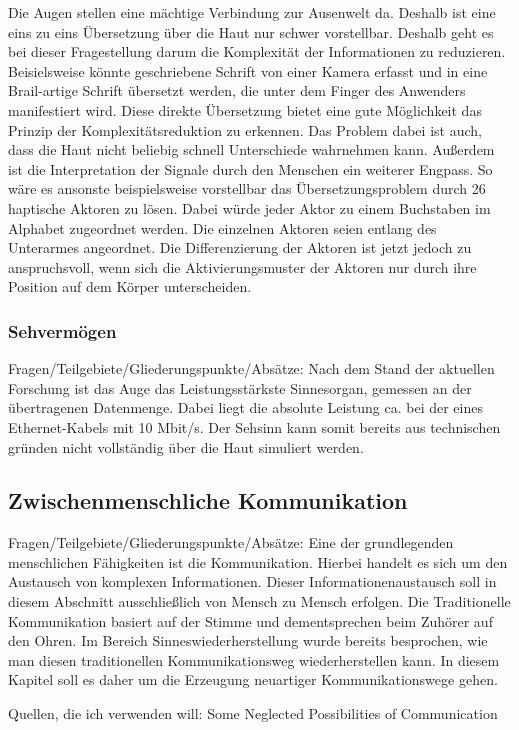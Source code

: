 \documentclass{llncs}					%
\begin{document}
Die Augen stellen eine mächtige Verbindung zur Ausenwelt da. Deshalb ist eine eins zu eins Übersetzung über die Haut nur schwer vorstellbar. Deshalb geht es bei dieser Fragestellung darum die Komplexität der Informationen zu reduzieren. Beisielsweise könnte geschriebene Schrift von einer Kamera erfasst und in eine Brail-artige Schrift übersetzt werden, die unter dem Finger des Anwenders manifestiert wird. Diese direkte Übersetzung bietet eine gute Möglichkeit das Prinzip der Komplexitätsreduktion zu erkennen. Das Problem dabei ist auch, dass die Haut nicht beliebig schnell Unterschiede wahrnehmen kann. Außerdem ist die Interpretation der Signale durch den Menschen ein weiterer Engpass. So wäre es ansonste beispielsweise vorstellbar das Übersetzungsproblem durch 26 haptische Aktoren zu lösen. Dabei würde jeder Aktor zu einem Buchstaben im Alphabet zugeordnet werden. Die einzelnen Aktoren seien entlang des Unterarmes angeordnet. Die Differenzierung der Aktoren ist jetzt jedoch zu anspruchsvoll, wenn sich die Aktivierungsmuster der Aktoren nur durch ihre Position auf dem Körper unterscheiden.
\subsubsection{Sehvermögen}
Fragen/Teilgebiete/Gliederungspunkte/Absätze:
Nach dem Stand der aktuellen Forschung ist das Auge das Leistungsstärkste Sinnesorgan, gemessen an der übertragenen Datenmenge\cite{Koch2006}. Dabei liegt die absolute Leistung ca. bei der eines Ethernet-Kabels mit 10 Mbit/s\cite{Koch2006}. Der Sehsinn kann somit bereits aus technischen gründen nicht vollständig über die Haut simuliert werden.
\subsection{Zwischenmenschliche Kommunikation}
Fragen/Teilgebiete/Gliederungspunkte/Absätze:
Eine der grundlegenden menschlichen Fähigkeiten ist die Kommunikation. Hierbei handelt es sich um den Austausch von komplexen Informationen. Dieser Informationenaustausch soll in diesem Abschnitt ausschließlich von Mensch zu Mensch erfolgen.
Die Traditionelle Kommunikation basiert auf der Stimme und dementsprechen beim Zuhörer auf den Ohren. Im Bereich Sinneswiederherstellung wurde bereits besprochen, wie man diesen traditionellen Kommunikationsweg wiederherstellen kann. In diesem Kapitel soll es daher um die Erzeugung neuartiger Kommunikationswege gehen.

Quellen, die ich verwenden will:
Some Neglected Possibilities of Communication\cite{10.2307/1705360}
\end{document}
